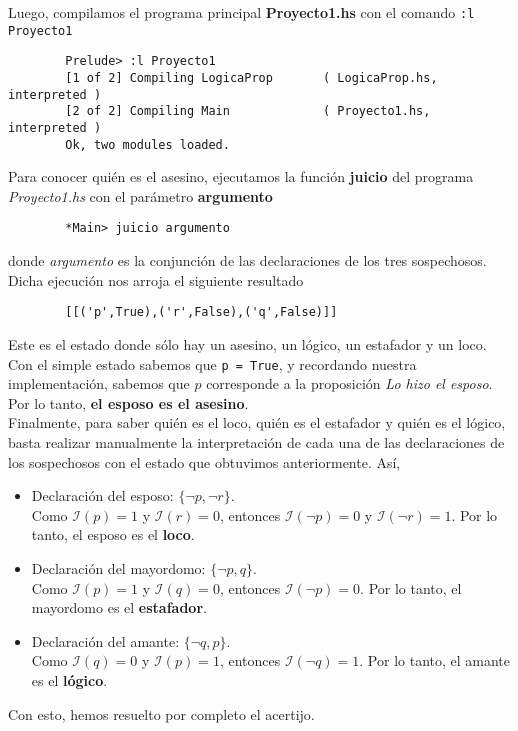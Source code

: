 \documentclass[letterpaper,12pt]{article}
\begin{document}
    \justify
    Luego, compilamos el programa principal \textbf{Proyecto1.hs} con el 
    comando \texttt{:l Proyecto1}
    \begin{lstlisting}
        Prelude> :l Proyecto1
        [1 of 2] Compiling LogicaProp       ( LogicaProp.hs, interpreted )
        [2 of 2] Compiling Main             ( Proyecto1.hs, interpreted )
        Ok, two modules loaded.
    \end{lstlisting}

    Para conocer quién es el asesino, ejecutamos la función \textbf{juicio} 
    del programa \textit{Proyecto1.hs} con el parámetro \textbf{argumento}
    \begin{lstlisting}
        *Main> juicio argumento
    \end{lstlisting}

    donde \textit{argumento} es la conjunción de las declaraciones de los 
    tres sospechosos. Dicha ejecución nos arroja el siguiente resultado
    \begin{lstlisting}
        [[('p',True),('r',False),('q',False)]]
    \end{lstlisting}

    \justify
    Este es el estado donde sólo hay un asesino, un lógico, un estafador 
    y un loco. Con el simple estado sabemos que \texttt{p = True}, y 
    recordando nuestra implementación, sabemos que $p$ corresponde a la 
    proposición \textit{Lo hizo el esposo}. Por lo tanto, 
    \textbf{el esposo es el asesino}. \\
    Finalmente, para saber quién es el loco, quién es el estafador y 
    quién es el lógico, basta realizar manualmente la interpretación de 
    cada una de las declaraciones de los sospechosos con el estado que 
    obtuvimos anteriormente. Así, 
    \begin{itemize}
        \item Declaración del esposo: $\{ \neg p, \neg r \}$. \\
        Como $\mathcal{I}(p) = 1$ y $\mathcal{I}(r) = 0$, entonces 
        $\mathcal{I}(\neg p) = 0$ y $\mathcal{I}(\neg r) = 1$. Por lo tanto,
        el esposo es el \textbf{loco}.
        \item Declaración del mayordomo: $\{\neg p, q \}$. \\
        Como $\mathcal{I}(p) = 1$ y $\mathcal{I}(q) = 0$, entonces 
        $\mathcal{I}(\neg p) = 0$. Por lo tanto, el mayordomo es el
        \textbf{estafador}.
        \item Declaración del amante: $\{\neg q, p \}$. \\
        Como $\mathcal{I}(q) = 0$ y $\mathcal{I}(p) = 1$, entonces 
        $\mathcal{I}(\neg q) = 1$. Por lo tanto, el amante es el 
        \textbf{lógico}. 
    \end{itemize}

    \justify
    Con esto, hemos resuelto por completo el acertijo.
    
\end{document}
